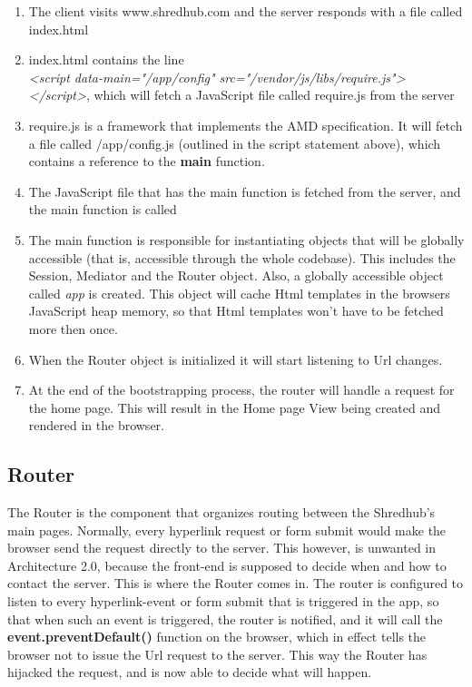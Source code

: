 \begin{enumerate}
\item{} The client visits www.shredhub.com and the server responds with a file called index.html
\item{} index.html contains the line \\ \textit{<script data-main="/app/config" src="/vendor/js/libs/require.js"></script>}, which will fetch a JavaScript file called require.js from the server
\item{} require.js is a framework that implements the AMD specification. It will fetch a file called /app/config.js (outlined in the script statement above), which contains a reference to the \textbf{main} function.
\item{} The JavaScript file that has the main function is fetched from the server, and the main function is called
\item{} The main function is responsible for instantiating objects that will be globally accessible (that is, accessible through the whole codebase). This includes the Session, Mediator and the Router object. Also, a globally accessible object called \textit{app} is created. This object will cache Html templates in the browsers JavaScript heap memory, so that Html templates won't have to be fetched more then once. 
\item{} When the Router object is initialized it will start listening to Url changes. 
\item{} At the end of the bootstrapping process, the router will handle a request for the home page. This will result in the Home page View being created and rendered in the browser.
\end{enumerate}

\subsection{Router}
The Router is the component that organizes routing between the Shredhub's main pages. Normally, every hyperlink request or form submit would make the browser send the request directly to the server. This however, is unwanted in Architecture 2.0, because the front-end is supposed to decide when and how to contact the server. This is where the Router comes in. The router is configured to listen to every hyperlink-event or form submit that is triggered in the app, so that when such an event is triggered, the router is notified, and it will call the \textbf{event.preventDefault()} function on the browser, which in effect tells the browser not to issue the Url request to the server. This way the Router has hijacked the request, and is now able to decide what will happen.  

